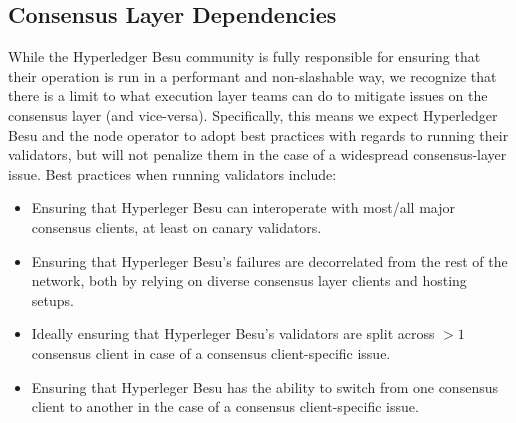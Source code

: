 \subsection{Consensus Layer Dependencies}
While the Hyperledger Besu community is fully responsible for ensuring that their operation is run in a performant and non-slashable way, we recognize that there is a limit to what execution layer teams can do to mitigate issues on the consensus layer (and vice-versa). Specifically, this means we expect Hyperledger Besu and the node operator to adopt best practices with regards to running their validators, but will not penalize them in the case of a widespread consensus-layer issue. Best practices when running validators include:
\begin{itemize}
\item Ensuring that Hyperleger Besu can interoperate with most/all major consensus clients, at least on canary validators.
\item Ensuring that Hyperleger Besu’s failures are decorrelated from the rest of the network, both by relying on diverse consensus layer clients and hosting setups.
\item Ideally ensuring that Hyperleger Besu’s validators are split across $>1$ consensus client in case of a consensus client-specific issue.
\item Ensuring that Hyperleger Besu has the ability to switch from one consensus client to another in the case of a consensus client-specific issue.
\end{itemize}